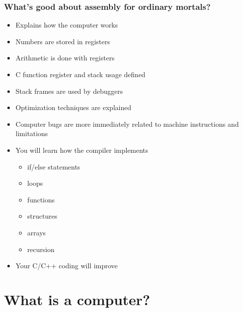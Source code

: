 \documentclass{beamer}
\begin{document}
\begin{frame}
    \frametitle{What's good about assembly for ordinary mortals?}
    \begin{itemize}
        \item Explains how the computer works
        \item Numbers are stored in registers
        \item Arithmetic is done with registers
        \item C function register and stack usage defined
        \item Stack frames are used by debuggers
        \item Optimization techniques are explained
        \item Computer bugs are more immediately related to machine
              instructions and limitations
        \item You will learn how the compiler implements
            \begin{itemize}
                \item if/else statements
                \item loops
                \item functions
                \item structures
                \item arrays
                \item recursion
            \end{itemize}
        \item Your C/C++ coding will improve
    \end{itemize}
\end{frame}

\section{What is a computer?}
\end{document}
